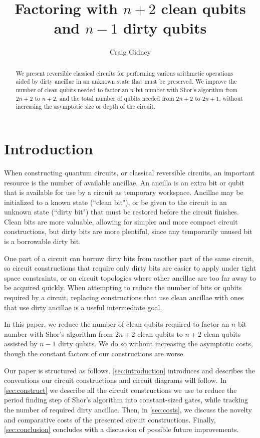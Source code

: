 \documentclass[twocolumn,longbibliography]{quantumarticle}
\title{Factoring with $n+2$ clean qubits and $n-1$ dirty qubits}
\author{Craig Gidney}
\affiliation{Google, Santa Barbara, CA 93117, USA}
\begin{document}
\maketitle

\begin{abstract}
We present reversible classical circuits for performing various arithmetic operations aided by dirty ancillae in an unknown state that must be preserved.
We improve the number of clean qubits needed to factor an $n$-bit number with Shor's algorithm \cite{Shor1999} from $2n+2$ \cite{takahashi2006, haner2016} to $n+2$, and the total number of qubits needed from $2n+2$ to $2n+1$, without increasing the asymptotic size or depth of the circuit.
\end{abstract}

\section{Introduction} \label{sec:introduction}

When constructing quantum circuits, or classical reversible circuits, an important resource is the number of available ancillae.
An ancilla is an extra bit or qubit that is available for use by a circuit as temporary workspace.
Ancillae may be initialized to a known state (``clean bit"), or be given to the circuit in an unknown state (``dirty bit") that must be restored before the circuit finishes.
Clean bits are more valuable, allowing for simpler and more compact circuit constructions, but dirty bits are more plentiful, since any temporarily unused bit is a borrowable dirty bit.

One part of a circuit can borrow dirty bits from another part of the same circuit, so circuit constructions that require only dirty bits are easier to apply under tight space constraints, or on circuit topologies where other ancillae are too far away to be acquired quickly.
When attempting to reduce the number of bits or qubits required by a circuit, replacing constructions that use clean ancillae with ones that use dirty ancillae is a useful intermediate goal.

In this paper, we reduce the number of clean qubits required to factor an $n$-bit number with Shor's algorithm from $2n+2$ clean qubits \cite{takahashi2006, haner2016} to $n+2$ clean qubits assisted by $n-1$ dirty qubits.
We do so without increasing the asymptotic costs, though the constant factors of our constructions are worse.

Our paper is structured as follows.
\autoref{sec:introduction} introduces and describes the conventions our circuit constructions and circuit diagrams will follow.
In \autoref{sec:construct} we describe all the circuit constructions we use to reduce the period finding step of Shor's algorithm into constant-sized gates, while tracking the number of required dirty ancillae.
Then, in \autoref{sec:costs}, we discuss the novelty and comparative costs of the presented circuit constructions.
Finally, \autoref{sec:conclusion} concludes with a discussion of possible future improvements.
\end{document}
